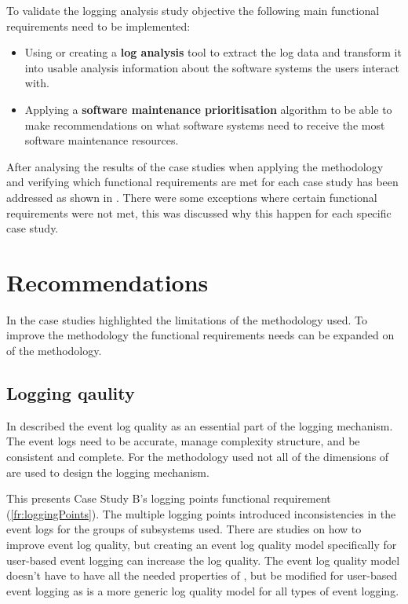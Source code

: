 \begin{enumerate}[label=\textbf{\Roman*.}]
	 To validate the logging analysis study objective the following main functional requirements need to be implemented:
	 \begin{itemize}
		\item Using or creating a \textbf{log analysis} tool to extract the log data and transform it into usable analysis information about the software systems the users interact with.
		\item Applying a \textbf{software maintenance prioritisation} algorithm to be able to make recommendations on what software systems need to receive the most software maintenance resources.
	 \end{itemize}

	 After analysing the results of the case studies when applying the methodology and verifying which functional requirements are met for each case study has been addressed as shown in . There were some exceptions where certain functional requirements were not met, this was discussed why this happen for each specific case study.
\end{enumerate}

\section{Recommendations}
In  the case studies highlighted the limitations of the methodology used. To improve the methodology the functional requirements needs can be expanded on of the methodology.

\subsection{Logging qaulity}
In  described the event log quality as an essential part of the logging mechanism. The event logs need to be accurate, manage complexity structure, and be consistent and complete. For the methodology used not all of the dimensions of  are used to design the logging mechanism.\par This presents Case Study B's logging points functional requirement (\ref{fr:loggingPoints}). The multiple logging points introduced inconsistencies in the event logs for the groups of subsystems used. There are studies on how to improve event log quality, but creating an event log quality model specifically for user-based event logging can increase the log quality. The event log quality model doesn't have to have all the needed properties of , but be modified for user-based event logging as  is a more generic log quality model for all types of event logging.

